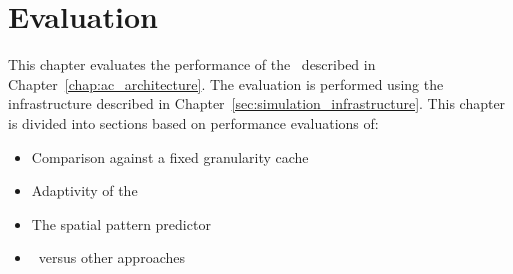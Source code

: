
%
%

\chapter{Evaluation}
\label{chap:evaluation}
This chapter evaluates the performance of the \AC\ described in Chapter~\ref{chap:ac_architecture}. The evaluation is performed using the infrastructure described in Chapter~\ref{sec:simulation_infrastructure}. This chapter is divided into sections based on performance evaluations of:
\begin{itemize}[noitemsep]
	\item Comparison against a fixed granularity cache
	\item Adaptivity of the \AC\
	\item The spatial pattern predictor
	\item \AC\ versus other approaches
\end{itemize}

